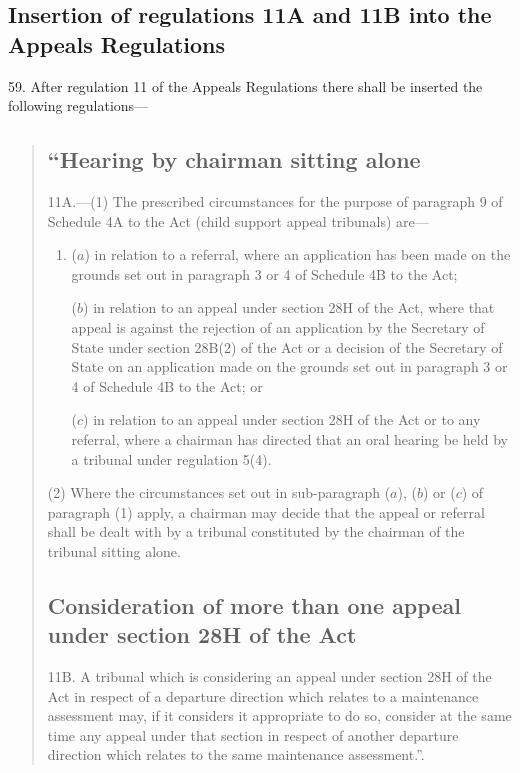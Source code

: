 \documentclass[12pt,a4paper]{article}
\begin{document}
\subsection[59. Insertion of regulations 11A and 11B into the Appeals Regulations]{Insertion of regulations 11A and 11B into the Appeals Regulations}

59. After
regulation 11 of the Appeals Regulations there shall be inserted the following
regulations—
\begin{quotation}
\subsection*{“Hearing by chairman sitting alone}

11A.—(1) The prescribed circumstances for the
purpose of paragraph 9 of Schedule 4A to the Act (child support appeal
tribunals) are—
\begin{enumerate}\item[]
($a$) in relation to a referral, where an application has been made on the grounds
set out in paragraph 3 or 4 of Schedule 4B to the Act;

($b$) in relation to an appeal under section 28H of the Act, where that appeal is
against the rejection of an application by the Secretary of State under section
28B(2) of the Act or a decision of the Secretary of State on an application made
on the grounds set out in paragraph 3 or 4 of Schedule 4B to the Act; or

($c$) in relation to an appeal under section 28H of the Act or to any referral,
where a chairman has directed that an oral hearing be held by a tribunal under
regulation 5(4).
\end{enumerate}

(2) Where the circumstances set out in sub-paragraph ($a$), ($b$) or ($c$) of
paragraph (1) apply, a chairman may decide that the appeal or referral shall be
dealt with by a tribunal constituted by the chairman of the tribunal sitting
alone.

\subsection*{Consideration of more than one appeal under section 28H of the Act}

11B. A
tribunal which is considering an appeal under section 28H of the Act in respect
of a departure direction which relates to a maintenance assessment may, if it
considers it appropriate to do so, consider at the same time any appeal under
that section in respect of another departure direction which relates to the same
maintenance assessment.”.
\end{quotation}
\end{document}
